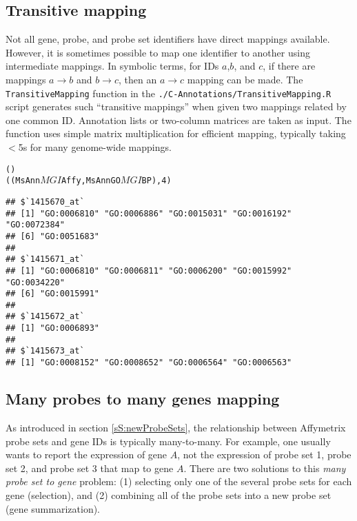 \subsection{Transitive mapping}
Not all gene, probe, and probe set identifiers have direct mappings
available. However, it is sometimes possible
to map one identifier to another using intermediate mappings.
In symbolic terms, for IDs $a$,$b$, and $c$, if there are mappings $a \rightarrow b$
and $b \rightarrow c$, then an $a \rightarrow c$ mapping can be made. The
\texttt{TransitiveMapping} function in the \texttt{./C-Annotations/TransitiveMapping.R}
script generates such ``transitive mappings'' when given two mappings
related by one common ID. Annotation lists or two-column
matrices are taken as input. The function uses simple matrix multiplication for
efficient mapping, typically taking $<$5s for many genome-wide mappings.

\singlespacing
\begin{knitrout}
\color{fgcolor}\begin{kframe}
\begin{alltt}
()
((MsAnn$MGI$Affy, MsAnnGO$MGI$BP), 4)
\end{alltt}
\begin{verbatim}
## $`1415670_at`
## [1] "GO:0006810" "GO:0006886" "GO:0015031" "GO:0016192" "GO:0072384"
## [6] "GO:0051683"
## 
## $`1415671_at`
## [1] "GO:0006810" "GO:0006811" "GO:0006200" "GO:0015992" "GO:0034220"
## [6] "GO:0015991"
## 
## $`1415672_at`
## [1] "GO:0006893"
## 
## $`1415673_at`
## [1] "GO:0008152" "GO:0008652" "GO:0006564" "GO:0006563"
\end{verbatim}
\end{kframe}
\end{knitrout}
\doublespacing


\subsection{Many probes to many genes mapping}
\label{sS:collapse}

As introduced in section \ref{sS:newProbeSets}, the relationship between 
Affymetrix probe sets and gene IDs is typically many-to-many. 
For example, one usually wants 
to report the expression of gene $A$, not the expression of 
probe set 1, probe set 2, and probe set 3 that map to gene $A$. There are two
solutions to this \emph{many probe set to gene} problem: (1) selecting only one of the several 
probe sets for each gene (selection), and (2) combining all of the probe sets 
into a new probe set (gene summarization).

